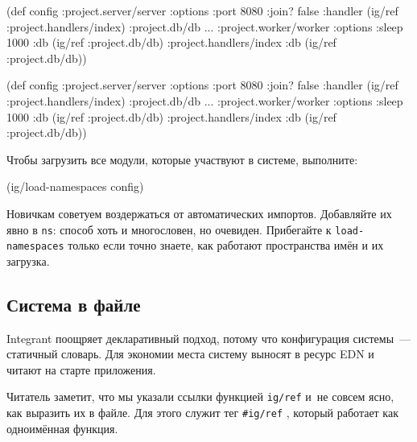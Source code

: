 \ifnarrow

\begin{english}
  \begin{clojure}
(def config
  {:project.server/server
   {:options {:port 8080 :join? false}
    :handler (ig/ref
               :project.handlers/index)}
   :project.db/db {...}
   :project.worker/worker
     {:options {:sleep 1000}
      :db      (ig/ref :project.db/db)}
   :project.handlers/index
     {:db (ig/ref :project.db/db)}})
  \end{clojure}
\end{english}

\else

\begin{english}
  \begin{clojure}
(def config
  {:project.server/server
   {:options {:port 8080 :join? false}
    :handler (ig/ref :project.handlers/index)}
   :project.db/db {...}
   :project.worker/worker
     {:options {:sleep 1000}
      :db      (ig/ref :project.db/db)}
   :project.handlers/index
     {:db (ig/ref :project.db/db)}})
  \end{clojure}
\end{english}

\fi

\noindent
Чтобы загрузить все модули, которые участвуют в системе, выполните:

\begin{english}
  \begin{clojure}
(ig/load-namespaces config)
  \end{clojure}
\end{english}

Новичкам советуем воздержаться от автоматических импортов. Добавляйте их явно в
\verb|ns|: способ хоть и многословен, но очевиден. Прибегайте к
\verb|load-namespaces| только если точно знаете, как работают пространства
имён и их загрузка.

\subsection{Система в файле}


Integrant поощряет декларативный подход, потому что конфигурация системы~---
статичный словарь. Для экономии места систему выносят в ресурс EDN и читают на
старте приложения.


Читатель заметит, что мы указали ссылки функцией \verb|ig/ref| и~не совсем ясно,
как выразить их в файле. Для этого служит тег \verb|#ig/ref| , который работает
как одноимённая функция.

